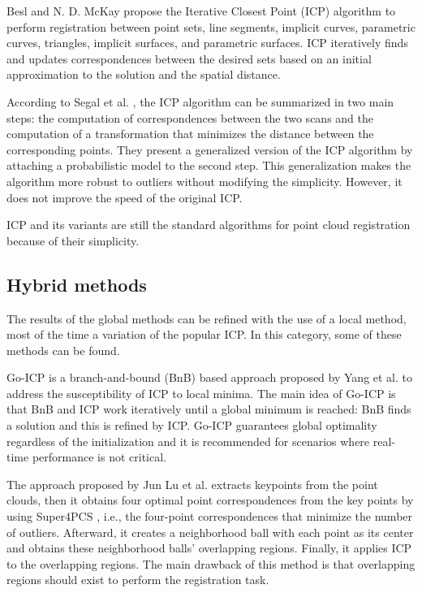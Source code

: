         Besl and N. D. McKay \cite{Besl_1992_amethod} propose the Iterative Closest Point (ICP) algorithm to perform registration 
        between point sets, line segments, implicit curves, parametric curves, triangles, implicit surfaces, and parametric surfaces.
        ICP iteratively finds and updates correspondences between the desired sets based on an initial approximation to the solution and 
        the spatial distance.

        According to Segal et al. \cite{Segal_2009_generalizedicp}, the ICP algorithm can be summarized in two main steps:
        the computation of correspondences between the two scans and 
        the computation of a transformation that minimizes the distance between the corresponding points.
        They present a generalized version of the ICP algorithm by attaching a probabilistic model to the second step.
        This generalization makes the algorithm more robust to outliers without modifying the simplicity. 
        However, it does not improve the speed of the original ICP.

        ICP and its variants are still the standard algorithms for point cloud registration because of their simplicity. 

        \subsection{Hybrid methods} 

        The results of the global methods can be refined with the use of a local method, most of the time a variation of the popular ICP.
        In this category, some of these methods can be found.

        Go-ICP is a branch-and-bound (BnB) based approach proposed by Yang et al. \cite{Yang_2016_goicp} to address the susceptibility of ICP to local minima. 
        The main idea of Go-ICP is that BnB and ICP work iteratively until a global minimum is reached: BnB finds a solution and this is refined by ICP.
        Go-ICP guarantees global optimality regardless of the initialization and it is recommended for scenarios where real-time performance is not critical.

        The approach proposed by Jun Lu et al. \cite{Lu_2019_4pcsicp} extracts keypoints from the point clouds, 
        then it obtains four optimal point correspondences from the key points by using Super4PCS \cite{Mellado_2014_super4pcs},
        i.e., the four-point correspondences that minimize the number of outliers. 
        Afterward, it creates a neighborhood ball with each point as its center and obtains these neighborhood balls’ overlapping regions. 
        Finally, it applies ICP to the overlapping regions. 
        The main drawback of this method is that overlapping regions should exist to perform the registration task.

